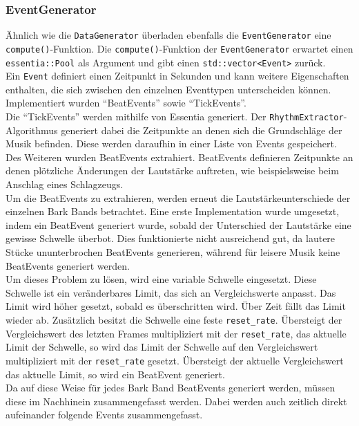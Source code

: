 \documentclass[11pt,a4paper]{article}
\begin{document}
\newpage
\subsubsection{EventGenerator}
Ähnlich wie die \lstinline!DataGenerator! überladen ebenfalls die \lstinline!EventGenerator! eine \lstinline!compute()!-Funktion. Die \lstinline!compute()!-Funktion der \lstinline!EventGenerator! erwartet einen \lstinline!essentia::Pool! als Argument und gibt einen \lstinline!std::vector<Event>! zurück.\\
Ein \lstinline!Event! definiert einen Zeitpunkt in Sekunden und kann weitere Eigenschaften enthalten, die sich zwischen den einzelnen Eventtypen unterscheiden können. Implementiert wurden ``BeatEvents'' sowie ``TickEvents''.\\
Die ``TickEvents'' werden mithilfe von Essentia generiert. Der \lstinline!RhythmExtractor!-Algorithmus generiert dabei die Zeitpunkte an denen sich die Grundschläge der Musik befinden. Diese werden daraufhin in einer Liste von Events gespeichert.\\
Des Weiteren wurden BeatEvents extrahiert. BeatEvents definieren Zeitpunkte an denen plötzliche Änderungen der Lautstärke auftreten, wie beispielsweise beim Anschlag eines Schlagzeugs.\\
Um die BeatEvents zu extrahieren, werden erneut die Lautstärkeunterschiede der einzelnen Bark Bands betrachtet. Eine erste Implementation wurde umgesetzt, indem ein BeatEvent generiert wurde, sobald der Unterschied der Lautstärke eine gewisse Schwelle überbot. Dies funktionierte nicht ausreichend gut, da lautere Stücke ununterbrochen BeatEvents generieren, während für leisere Musik keine BeatEvents generiert werden.\\
Um dieses Problem zu lösen, wird eine variable Schwelle eingesetzt. Diese Schwelle ist ein veränderbares Limit, das sich an Vergleichswerte anpasst. Das Limit wird höher gesetzt, sobald es überschritten wird. Über Zeit fällt das Limit wieder ab. Zusätzlich besitzt die Schwelle eine feste \lstinline!reset_rate!. Übersteigt der Vergleichswert des letzten Frames multipliziert mit der \lstinline!reset_rate!, das aktuelle Limit der Schwelle, so wird das Limit der Schwelle auf den Vergleichswert multipliziert mit der \lstinline!reset_rate! gesetzt. Übersteigt der aktuelle Vergleichswert das aktuelle Limit, so wird ein BeatEvent generiert.\\
Da auf diese Weise für jedes Bark Band BeatEvents generiert werden, müssen diese im Nachhinein zusammengefasst werden. Dabei werden auch zeitlich direkt aufeinander folgende Events zusammengefasst.
\end{document}
